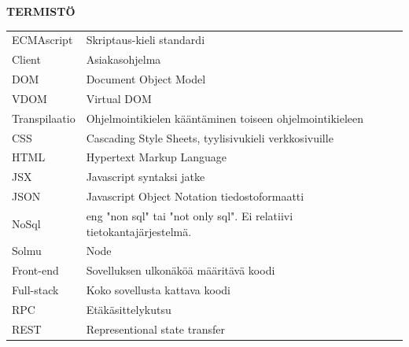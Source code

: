 \documentclass[11pt,a4paper,titlepage,oneside]{article}
\begin{document}
\textbf{ TERMISTÖ }\\
\bigskip

\begin{tabular}{ p{3.7cm} b{12cm} }
ECMAscript\bigskip & Skriptaus-kieli standardi \\ 
Client\bigskip & Asiakasohjelma\\
DOM\bigskip & Document Object Model\\
VDOM\bigskip & Virtual DOM\\
Transpilaatio\bigskip & Ohjelmointikielen kääntäminen toiseen ohjelmointikieleen\\
CSS\bigskip & Cascading Style Sheets, tyylisivukieli verkkosivuille\\
HTML\bigskip & Hypertext Markup Language\\
JSX\bigskip & Javascript syntaksi jatke\\
JSON\bigskip & Javascript Object Notation tiedostoformaatti\\
NoSql\bigskip & eng "non sql" tai "not only sql". Ei relatiivi tietokantajärjestelmä. \\
Solmu\bigskip & Node\\
Front-end\bigskip & Sovelluksen ulkonäköä määritävä koodi\\
Full-stack\bigskip & Koko sovellusta kattava koodi\\
RPC\bigskip & Etäkäsittelykutsu\\
REST\bigskip & Representional state transfer\\
\end{tabular}




\newpage

\clearpage
\setcounter{page}{1}

\pagestyle{fancy}
\lfoot{}
\cfoot{}
\rfoot{}
\lhead{}
\chead{}
\rhead{\thepage}
\renewcommand{\headrulewidth}{0pt}
\renewcommand{\footrulewidth}{0pt}


\end{document}
